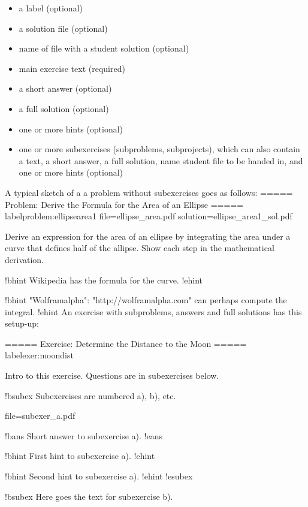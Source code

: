 \documentclass[%
oneside,                 %
final,                   %
chapterprefix=true,      %
open=right               %
10pt]{book}
\begin{document}
{\begin{itemize}
  \item a label (optional)

  \item a solution file (optional)

  \item name of file with a student solution (optional)

  \item main exercise text (required)

  \item a short answer (optional)

  \item a full solution (optional)

  \item one or more hints (optional)

  \item one or more subexercises (subproblems, subprojects), which can also
    contain a text, a short answer, a full solution, name student file
    to be handed in, and one or more hints (optional)
\end{itemize}

\noindent
A typical sketch of a a problem without subexercises goes as follows:
\bccq
===== Problem: Derive the Formula for the Area of an Ellipse =====
label{problem:ellipsearea1}
file=ellipse_area.pdf
solution=ellipse_area1_sol.pdf

Derive an expression for the area of an ellipse by integrating
the area under a curve that defines half of the allipse.
Show each step in the mathematical derivation.

!bhint
Wikipedia has the formula for the curve.
!ehint

!bhint
"Wolframalpha": "http://wolframalpha.com" can perhaps
compute the integral.
!ehint
\eccq
An exercise with subproblems, answers and full solutions has this
setup-up:

\bccq
===== Exercise: Determine the Distance to the Moon =====
label{exer:moondist}

Intro to this exercise. Questions are in subexercises below.

!bsubex
Subexercises are numbered a), b), etc.

file=subexer_a.pdf

!bans
Short answer to subexercise a).
!eans

!bhint
First hint to subexercise a).
!ehint

!bhint
Second hint to subexercise a).
!ehint
!esubex

!bsubex
Here goes the text for subexercise b).

}
\end{document}
